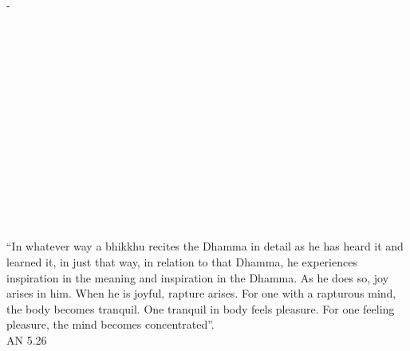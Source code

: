 
\cleartorecto
\thispagestyle{empty}
-\vspace*{3em}

{\centering


  \\[1.0\baselineskip] \fi

  \\[1.0\baselineskip] \fi

  \ifafiveversion {}
    {\Huge\chapterTitleFont\textsc{{\thesubtitle\linebreak}}}\\[0.2\baselineskip] \fi

  \ifasixversion {\fontsize{18}{14}\chapterTitleFont\textsc{{\thesubtitle\linebreak}}}\\[0.2\baselineskip] \fi

  \ifafiveversion {}\\[1.4\baselineskip] \fi

  \ifasixversion {}\\[1.4\baselineskip] \fi


  \\[2.5\baselineskip] \fi

  \\[2.5\baselineskip] \fi

  {\quote ``In whatever way a bhikkhu recites the Dhamma in detail as he has heard it and learned it, in just that way, in relation to that Dhamma, he experiences inspiration in the meaning and inspiration in the Dhamma. As he does so, joy arises in him. When he is joyful, rapture arises. For one with a rapturous mind, the body becomes tranquil. One tranquil in body feels pleasure. For one feeling pleasure, the mind becomes concentrated''.\\}\ifafiveversion \smallskip \fi \ifasixversion \medskip\tiny \fi AN 5.26\\[1.4\baselineskip]
}

